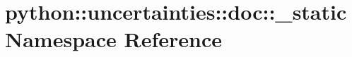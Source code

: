 \hypertarget{namespacepython_1_1uncertainties_1_1doc_1_1__static}{
\section{python::uncertainties::doc::\_\-static Namespace Reference}
\label{namespacepython_1_1uncertainties_1_1doc_1_1__static}
}
